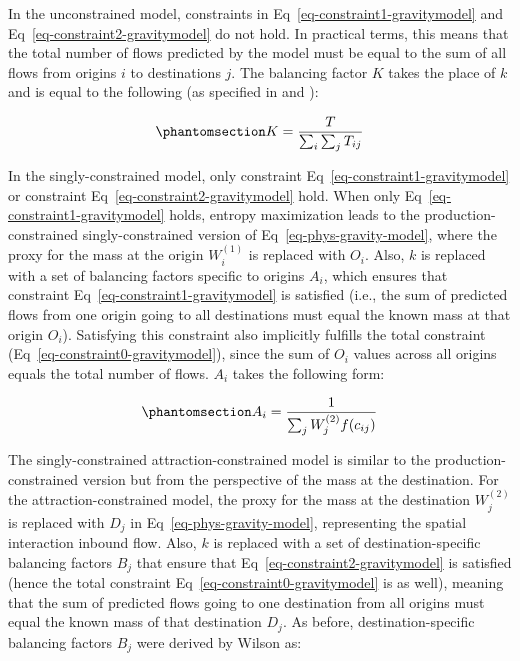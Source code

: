 \documentclass[
  10pt,
  letterpaper,
]{article}
\begin{document}
In the unconstrained model, constraints in
Eq~\ref{eq-constraint1-gravitymodel} and
Eq~\ref{eq-constraint2-gravitymodel} do not hold. In practical terms,
this means that the total number of flows predicted by the model must be
equal to the sum of all flows from origins \(i\) to destinations \(j\).
The balancing factor \(K\) takes the place of \(k\) and is equal to the
following (as specified in \citep{cliff_evaluating_1974} and
\citep{fotheringham_spatial_1984}):

\begin{equation}\phantomsection\label{eq-total-flow-balancing-factor}{
K=\frac{T}{\sum_i\sum_j T_{ij}}
}\end{equation}

In the singly-constrained model, only constraint
Eq~\ref{eq-constraint1-gravitymodel} or constraint
Eq~\ref{eq-constraint2-gravitymodel} hold. When only
Eq~\ref{eq-constraint1-gravitymodel} holds, entropy maximization leads
to the production-constrained singly-constrained version of
Eq~\ref{eq-phys-gravity-model}, where the proxy for the mass at the
origin \(W_i^{(1)}\) is replaced with \(O_i\). Also, \(k\) is replaced
with a set of balancing factors specific to origins \(A_i\), which
ensures that constraint Eq~\ref{eq-constraint1-gravitymodel} is
satisfied (i.e., the sum of predicted flows from one origin going to all
destinations must equal the known mass at that origin \(O_i\)).
Satisfying this constraint also implicitly fulfills the total constraint
(Eq~\ref{eq-constraint0-gravitymodel}), since the sum of \(O_i\) values
across all origins equals the total number of flows. \(A_i\) takes the
following form:

\begin{equation}\phantomsection\label{eq-production-constrained-balancing-factor}{
A_i = \frac{1}{\sum_j W_j^{(2)} f(c_{ij})}
}\end{equation}

The singly-constrained attraction-constrained model is similar to the
production-constrained version but from the perspective of the mass at
the destination. For the attraction-constrained model, the proxy for the
mass at the destination \(W_j^{(2)}\) is replaced with \(D_j\) in
Eq~\ref{eq-phys-gravity-model}, representing the spatial interaction
inbound flow. Also, \(k\) is replaced with a set of destination-specific
balancing factors \(B_j\) that ensure that
Eq~\ref{eq-constraint2-gravitymodel} is satisfied (hence the total
constraint Eq~\ref{eq-constraint0-gravitymodel} is as well), meaning
that the sum of predicted flows going to one destination from all
origins must equal the known mass of that destination \(D_j\). As
before, destination-specific balancing factors \(B_j\) were derived by
Wilson as:
\end{document}
